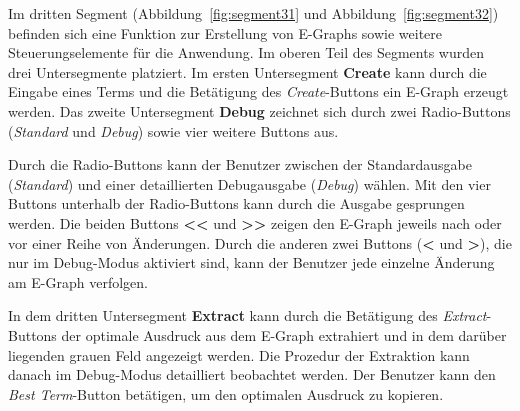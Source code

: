Im dritten Segment (Abbildung~\ref{fig:segment31} und Abbildung~\ref{fig:segment32}) befinden sich eine Funktion zur Erstellung von E-Graphs sowie weitere Steuerungselemente für die Anwendung.
Im oberen Teil des Segments wurden drei Untersegmente platziert. Im ersten Untersegment \textbf{Create} kann durch die Eingabe eines Terms und die Betätigung des \textit{Create}-Buttons
ein E-Graph erzeugt werden. Das zweite Untersegment \textbf{Debug} zeichnet sich durch zwei Radio-Buttons (\textit{Standard} und \textit{Debug}) sowie vier weitere Buttons aus. 

Durch die Radio-Buttons kann der Benutzer zwischen der Standardausgabe (\textit{Standard}) und einer detaillierten Debugausgabe (\textit{Debug}) wählen.
Mit den vier Buttons unterhalb der Radio-Buttons kann durch die Ausgabe gesprungen werden. Die beiden Buttons \textbf{<<} und \textbf{>>} zeigen den E-Graph jeweils nach oder vor einer 
Reihe von Änderungen. Durch die anderen zwei Buttons (\textbf{<} und \textbf{>}), die nur im Debug-Modus aktiviert sind, kann der Benutzer jede einzelne Änderung am E-Graph verfolgen. 

In dem dritten Untersegment \textbf{Extract} kann durch die Betätigung des \textit{Extract}-Buttons der optimale Ausdruck aus dem E-Graph extrahiert und in dem darüber liegenden grauen Feld angezeigt werden.
Die Prozedur der Extraktion kann danach im Debug-Modus detailliert beobachtet werden. 
Der Benutzer kann den \textit{Best Term}-Button betätigen, um den optimalen Ausdruck zu kopieren.
\newpage


